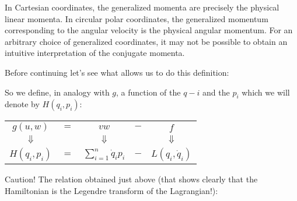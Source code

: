 	In Cartesian coordinates, the generalized momenta are precisely the physical linear momenta. In circular polar coordinates, the generalized momentum corresponding to the angular velocity is the physical angular momentum. For an arbitrary choice of generalized coordinates, it may not be possible to obtain an intuitive interpretation of the conjugate momenta.
	
	Before continuing let's see what allows us to do this definition:
	
	So we define, in analogy with $g$, a function of the $q-i$ and the $p_i$ which we will denote by $H(q_i,p_i)$:
	
	\begin{center}
	\begin{tabular}{ccccc}
	$g(u,w)$ & $=$ & $vw$ & $-$ & $f$\\ 

	$\Downarrow$ & & $\Downarrow$ & & $\Downarrow$ \\ 
	$H(q_i,p_i)$ & $=$ & $\displaystyle\sum_{i=1}^n\dot{q}_ip_i$ & $-$ & $L(q_i,\dot{q}_i)$ \\ 
	\end{tabular} 
	\end{center}
	Caution! The relation obtained just above (that shows clearly that the Hamiltonian is the Legendre transform of the Lagrangian!):
	
